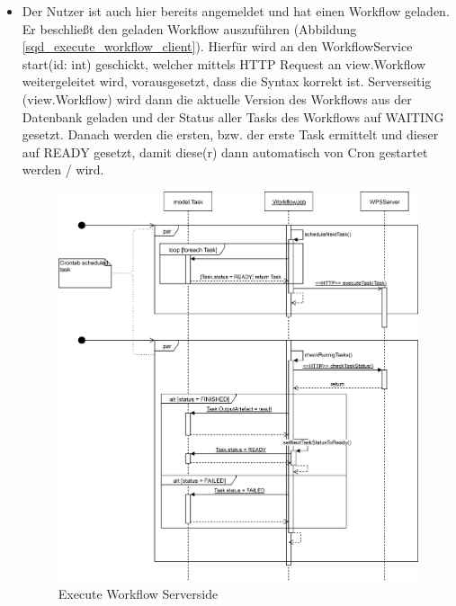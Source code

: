 \begin{itemize}
    \item Der Nutzer ist auch hier bereits angemeldet und hat einen Workflow geladen. Er beschließt den geladen Workflow auszuführen (Abbildung \ref{sqd_execute_workflow_client}). Hierfür wird an den WorkflowService start(id: int) geschickt, welcher mittels HTTP Request an view.Workflow weitergeleitet wird, vorausgesetzt, dass die Syntax korrekt ist. Serverseitig (view.Workflow) wird dann die aktuelle Version des Workflows aus der Datenbank geladen und der Status aller Tasks des Workflows auf \grqq{}WAITING\grqq{}  gesetzt. Danach werden die ersten, bzw. der erste Task ermittelt und dieser auf \grqq{}READY\grqq{}  gesetzt, damit diese(r) dann automatisch von Cron gestartet werden / wird. \newline\newline
    
    \begin{figure}[H]
        \centering
        \includegraphics[width=15cm]{images/sqd_execute_workflow_server.jpg}
        \caption{Execute Workflow Serverside}
        \label{sqd_execute_workflow_server}
    \end{figure}
    

\end{itemize}
